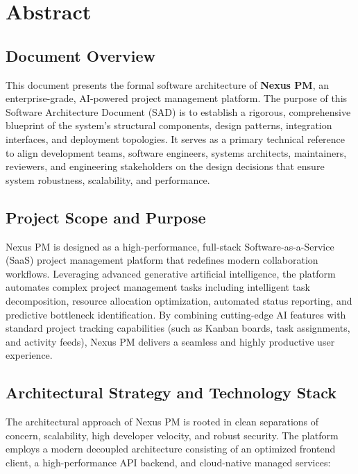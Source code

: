 \chapter{Abstract}
\label{chap:abstract}

\section*{Document Overview}
This document presents the formal software architecture of \textbf{Nexus PM}, an enterprise-grade, AI-powered project management platform. The purpose of this Software Architecture Document (SAD) is to establish a rigorous, comprehensive blueprint of the system's structural components, design patterns, integration interfaces, and deployment topologies. It serves as a primary technical reference to align development teams, software engineers, systems architects, maintainers, reviewers, and engineering stakeholders on the design decisions that ensure system robustness, scalability, and performance.

\section*{Project Scope and Purpose}
Nexus PM is designed as a high-performance, full-stack Software-as-a-Service (SaaS) project management platform that redefines modern collaboration workflows. Leveraging advanced generative artificial intelligence, the platform automates complex project management tasks including intelligent task decomposition, resource allocation optimization, automated status reporting, and predictive bottleneck identification. By combining cutting-edge AI features with standard project tracking capabilities (such as Kanban boards, task assignments, and activity feeds), Nexus PM delivers a seamless and highly productive user experience.

\section*{Architectural Strategy and Technology Stack}
The architectural approach of Nexus PM is rooted in clean separations of concern, scalability, high developer velocity, and robust security. The platform employs a modern decoupled architecture consisting of an optimized frontend client, a high-performance API backend, and cloud-native managed services:

